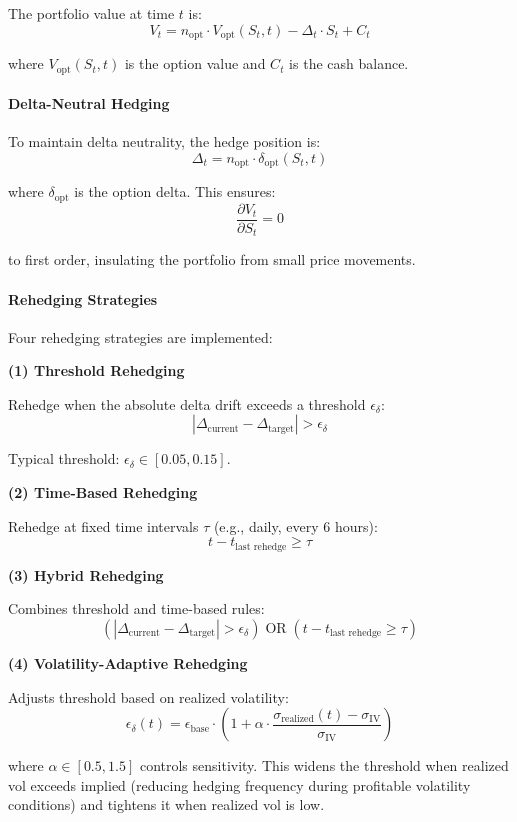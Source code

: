 The portfolio value at time $t$ is:
\[
V_t = n_{\text{opt}} \cdot V_{\text{opt}}(S_t, t) - \Delta_t \cdot S_t + C_t
\]

where $V_{\text{opt}}(S_t, t)$ is the option value and $C_t$ is the cash balance.

\paragraph{Delta-Neutral Hedging}

To maintain delta neutrality, the hedge position is:
\[
\Delta_t = n_{\text{opt}} \cdot \delta_{\text{opt}}(S_t, t)
\]

where $\delta_{\text{opt}}$ is the option delta. This ensures:
\[
\frac{\partial V_t}{\partial S_t} = 0
\]

to first order, insulating the portfolio from small price movements.

\paragraph{Rehedging Strategies}

Four rehedging strategies are implemented:

\textbf{(1) Threshold Rehedging}

Rehedge when the absolute delta drift exceeds a threshold $\epsilon_\delta$:
\[
|\Delta_{\text{current}} - \Delta_{\text{target}}| > \epsilon_\delta
\]

Typical threshold: $\epsilon_\delta \in [0.05, 0.15]$.

\textbf{(2) Time-Based Rehedging}

Rehedge at fixed time intervals $\tau$ (e.g., daily, every 6 hours):
\[
t - t_{\text{last rehedge}} \geq \tau
\]

\textbf{(3) Hybrid Rehedging}

Combines threshold and time-based rules:
\[
\left( |\Delta_{\text{current}} - \Delta_{\text{target}}| > \epsilon_\delta \right) \; \text{OR} \; \left( t - t_{\text{last rehedge}} \geq \tau \right)
\]

\textbf{(4) Volatility-Adaptive Rehedging}

Adjusts threshold based on realized volatility:
\[
\epsilon_\delta(t) = \epsilon_{\text{base}} \cdot \left( 1 + \alpha \cdot \frac{\sigma_{\text{realized}}(t) - \sigma_{\text{IV}}}{\sigma_{\text{IV}}} \right)
\]

where $\alpha \in [0.5, 1.5]$ controls sensitivity. This widens the threshold when realized vol exceeds implied (reducing hedging frequency during profitable volatility conditions) and tightens it when realized vol is low.

